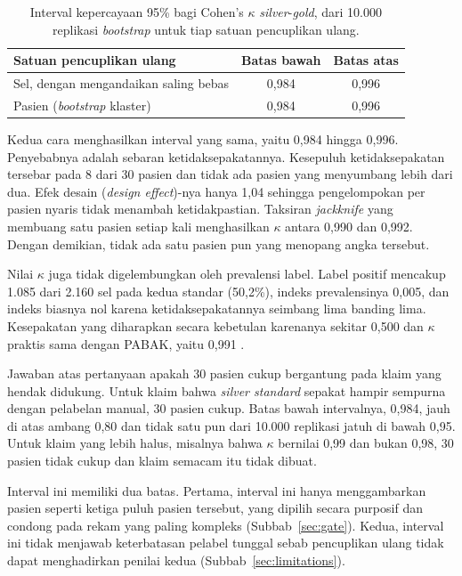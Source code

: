 \begin{table}[h]
\centering
\caption{Interval kepercayaan 95\% bagi Cohen's $\kappa$ \emph{silver}-\emph{gold}, dari
10.000 replikasi \emph{bootstrap} untuk tiap satuan pencuplikan ulang.}
\label{tab:kappa-ci}
\begin{tabular}{lcc}
\hline
\textbf{Satuan pencuplikan ulang} & \textbf{Batas bawah} & \textbf{Batas atas} \\
\hline
Sel, dengan mengandaikan saling bebas & 0,984 & 0,996 \\
Pasien (\emph{bootstrap} klaster)      & 0,984 & 0,996 \\
\hline
\end{tabular}
\end{table}

Kedua cara menghasilkan interval yang sama, yaitu 0,984 hingga 0,996. Penyebabnya adalah
sebaran ketidaksepakatannya. Kesepuluh ketidaksepakatan tersebar pada 8 dari 30 pasien dan
tidak ada pasien yang menyumbang lebih dari dua. Efek desain (\emph{design effect})-nya hanya
1,04 sehingga pengelompokan per pasien nyaris tidak menambah ketidakpastian. Taksiran
\emph{jackknife} yang membuang satu pasien setiap kali menghasilkan $\kappa$ antara 0,990 dan
0,992. Dengan demikian, tidak ada satu pasien pun yang menopang angka tersebut.

Nilai $\kappa$ juga tidak digelembungkan oleh prevalensi label. Label positif mencakup 1.085 dari
2.160 sel pada kedua standar (50,2\%), indeks prevalensinya 0,005, dan indeks biasnya nol
karena ketidaksepakatannya seimbang lima banding lima. Kesepakatan yang diharapkan secara
kebetulan karenanya sekitar 0,500 dan $\kappa$ praktis sama dengan PABAK, yaitu 0,991
\cite{byrt1993}.

Jawaban atas pertanyaan apakah 30 pasien cukup bergantung pada klaim yang hendak didukung.
Untuk klaim bahwa \emph{silver standard} sepakat hampir sempurna dengan pelabelan manual, 30
pasien cukup. Batas bawah intervalnya, 0,984, jauh di atas ambang 0,80 \cite{landis1977} dan
tidak satu pun dari 10.000 replikasi jatuh di bawah 0,95. Untuk klaim yang lebih halus,
misalnya bahwa $\kappa$ bernilai 0,99 dan bukan 0,98, 30 pasien tidak cukup dan klaim
semacam itu tidak dibuat.

Interval ini memiliki dua batas. Pertama, interval ini hanya menggambarkan pasien seperti
ketiga puluh pasien tersebut, yang dipilih secara purposif dan condong pada rekam yang paling
kompleks (Subbab~\ref{sec:gate}). Kedua, interval ini tidak menjawab keterbatasan pelabel
tunggal sebab pencuplikan ulang tidak dapat menghadirkan penilai kedua
(Subbab~\ref{sec:limitations}).

